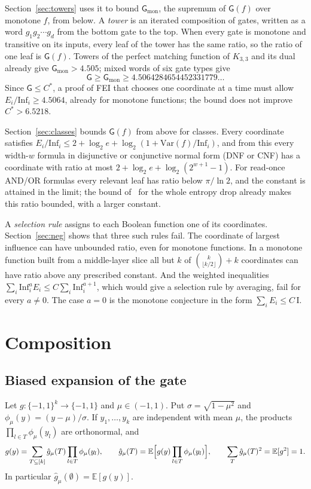 \documentclass[11pt]{amsart}
\theoremstyle{definition}
\theoremstyle{remark}
\newcommand{\Inf}{\mathrm{Inf}}
\newcommand{\E}{\mathbb{E}}
\newcommand{\G}{\mathsf{G}}
\begin{document}
Section~\ref{sec:towers} uses it to bound $\G_{\mathrm{mon}}$, the supremum of $\G(f)$ over monotone $f$, from below.
A \emph{tower} is an iterated composition of gates, written as a word $g_1g_2\cdots g_d$ from the bottom gate to the
top. When every gate is monotone and transitive on its inputs, every leaf of the tower has the same ratio, so the
ratio of one leaf is $\G(f)$. Towers of the perfect matching function of $K_{3,3}$ and its dual already give $\G_{\mathrm{mon}}>4.505$;
mixed words of six gate types give
\[
\G\ge\G_{\mathrm{mon}}\ge 4.5064284654452331779\dots
\]
Since $\G\le C^\ast$, a proof of FEI that chooses one coordinate at a time must allow $E_i/\Inf_i\ge4.5064$,
already for monotone functions; the bound does not improve $C^\ast>6.5218$.

Section~\ref{sec:classes} bounds $\G(f)$ from above for classes. Every coordinate satisfies
$E_i/\Inf_i\le 2+\log_2 e+\log_2(1+\mathrm{Var}(f)/\Inf_i)$, and from this every width-$w$ formula in disjunctive or conjunctive normal form (DNF or CNF) has a
coordinate with ratio at most $2+\log_2 e+\log_2(2^{w+1}-1)$. For read-once AND/OR formulas every relevant leaf
has ratio below $\pi/\ln 2$, and the constant is attained in the limit; the bound of~\cite{Shm1} for the whole
entropy drop already makes this ratio bounded, with a larger constant.

A \emph{selection rule} assigns to each Boolean function one of its coordinates. Section~\ref{sec:neg} shows that
three such rules fail. The coordinate of largest influence can have unbounded ratio,
even for monotone functions. In a monotone function built from a middle-layer slice all but $k$ of
$\binom{k}{\lfloor k/2\rfloor}+k$ coordinates can have ratio above any prescribed constant. And the weighted
inequalities $\sum_i\Inf_i^{a}E_i\le C\sum_i\Inf_i^{a+1}$, which would give a selection rule by averaging, fail for
every $a\ne0$. The case $a=0$ is the monotone conjecture in the form $\sum_iE_i\le C\,\mathrm I$.

\section{Composition}\label{sec:comp}

\subsection{Biased expansion of the gate}\label{sec:biased}
Let $g:\{-1,1\}^k\to\{-1,1\}$ and $\mu\in(-1,1)$. Put $\sigma=\sqrt{1-\mu^2}$ and $\phi_\mu(y)=(y-\mu)/\sigma$. If
$y_1,\dots,y_k$ are independent with mean $\mu$, the products $\prod_{l\in T}\phi_\mu(y_l)$ are orthonormal, and
\[
g(y)=\sum_{T\subseteq[k]}\hat g_\mu(T)\prod_{l\in T}\phi_\mu(y_l),\qquad
\hat g_\mu(T)=\E\Bigl[g(y)\prod_{l\in T}\phi_\mu(y_l)\Bigr],\qquad \sum_T\hat g_\mu(T)^2=\E[g^2]=1.
\]
In particular $\hat g_\mu(\emptyset)=\E[g(y)]$.
\end{document}
